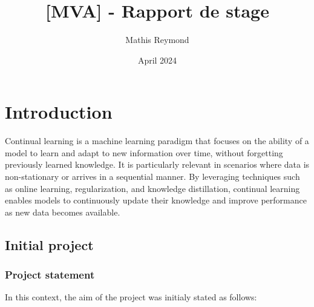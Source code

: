 \documentclass{article}
\title{[MVA] - Rapport de stage}
\author{Mathis Reymond}
\date{April 2024}
\begin{document}
\maketitle

\section{Introduction}

Continual learning is a machine learning paradigm that focuses on the ability of a model to learn and adapt to new information over time, without forgetting previously learned knowledge. It is particularly relevant in scenarios where data is non-stationary or arrives in a sequential manner. By leveraging techniques such as online learning, regularization, and knowledge distillation, continual learning enables models to continuously update their knowledge and improve performance as new data becomes available.

\subsection{Initial project}
\subsubsection{Project statement}

In this context, the aim of the project was initialy stated as follows:
\end{document}
